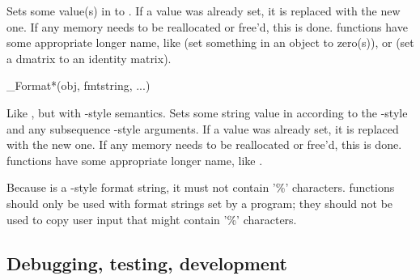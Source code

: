 \begin{sreapi}
Sets some value(s) in  to . If a value was
already set, it is replaced with the new one. If any memory needs to
be reallocated or free'd, this is done.  functions have
some appropriate longer name, like  (set something
in an object to zero(s)), or  (set
a dmatrix to an identity matrix).

\hypertarget{ifc:Format}
{\item[\_Format*(obj, fmtstring, ...)]}

Like , but with -style semantics.  Sets
some string value in  according to the
-style  and any subsequence
-style arguments. If a value was already set, it is
replaced with the new one. If any memory needs to be reallocated or
free'd, this is done.   functions have some
appropriate longer name, like
.

Because  is a -style format string,
it must not contain '\%' characters.  functions
should only be used with format strings set by a program; they should
not be used to copy user input that might contain '\%' characters.
\end{sreapi}


\subsection{Debugging, testing, development}

